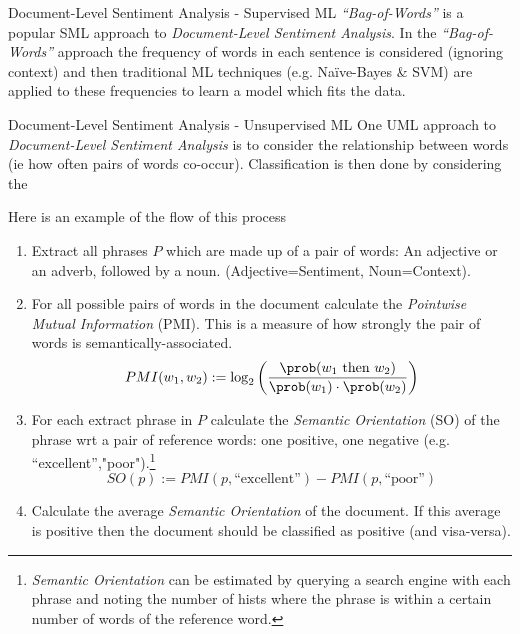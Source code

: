 \documentclass[11pt,a4paper]{article}
\begin{document}
  \begin{proposition}{Document-Level Sentiment Analysis - Supervised ML}
    \textit{``Bag-of-Words''} is a popular SML approach to \textit{Document-Level Sentiment Analysis}. In the \textit{``Bag-of-Words''} approach the frequency of words in each sentence is considered (ignoring context) and then traditional ML techniques (e.g. Na\"ive-Bayes \& SVM) are applied to these frequencies to learn a model which fits the data.
  \end{proposition}

  \begin{proposition}{Document-Level Sentiment Analysis - Unsupervised ML}
    One UML approach to \textit{Document-Level Sentiment Analysis} is to consider the relationship between words (ie how often pairs of words co-occur). Classification is then done by considering the
    \par Here is an example of the flow of this process
    \begin{enumerate}
      \item Extract all phrases $P$ which are made up of a pair of words: An adjective or an adverb, followed by a noun. (Adjective=Sentiment, Noun=Context).
      \item For all possible pairs of words in the document calculate the \textit{Pointwise Mutual Information} (PMI). This is a measure of how strongly the pair of words is semantically-associated.
      \[ PMI(w_1,w_2):=\log_2\left(\frac{\prob(w_1\text{ then }w_2)}{\prob(w_1)\cdot\prob(w_2)}\right) \]
      \item For each extract phrase in $P$ calculate the \textit{Semantic Orientation} (SO) of the phrase wrt a pair of reference words: one positive, one negative (e.g. ``excellent'',"poor").\footnote{\textit{Semantic Orientation} can be estimated by querying a search engine with each phrase and noting the number of hists where the phrase is within a certain number of words of the reference word.}
      \[ SO(p):=PMI(p,\text{``excellent''})-PMI(p,\text{``poor''}) \]
      \item Calculate the average \textit{Semantic Orientation} of the document. If this average is positive then the document should be classified as positive (and visa-versa).
    \end{enumerate}
  \end{proposition}
\end{document}
